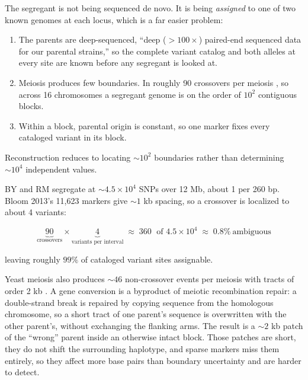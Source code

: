 The segregant is not being sequenced de novo. It is being \emph{assigned} to one of two
known genomes at each locus, which is a far easier problem:

\begin{enumerate}[leftmargin=1.4em,itemsep=1pt,topsep=2pt]
  \item The parents are deep-sequenced, ``deep ($>100\times$) paired-end sequenced data for
    our parental strains,'' so the complete variant catalog and both alleles at every site
    are known before any segregant is looked at.
  \item Meiosis produces few boundaries. In  roughly 90 crossovers per
    meiosis \citep{manceraHighResolutionMapping2008}, so across 16 chromosomes a segregant
    genome is on the order of $10^2$ contiguous blocks.
  \item Within a block, parental origin is constant, so one marker fixes every cataloged
    variant in its block.
\end{enumerate}

Reconstruction reduces to locating $\sim\!10^2$ boundaries rather than determining
$\sim\!10^4$ independent values.

 BY and RM
segregate at $\sim\!4.5\times10^4$ SNPs over 12 Mb, about 1 per 260 bp. Bloom 2013's 11,623
markers give $\sim\!1$ kb spacing, so a crossover is localized to about 4 variants:

$$
\underbrace{90}_{\text{crossovers}} \times \underbrace{4}_{\text{variants per interval}}
\;\approx\; 360 \;\text{ of } 4.5\times10^4 \;\approx\; 0.8\%\ \text{ambiguous}
$$

leaving roughly $99\%$ of cataloged variant sites assignable. 

 Yeast meiosis also produces $\sim\!46$
non-crossover  events per meiosis with tracts of order 2 kb
\citep{manceraHighResolutionMapping2008}. A gene conversion is a byproduct of meiotic
recombination repair: a double-strand break is repaired by copying sequence from the
homologous chromosome, so a short tract of one parent's sequence is overwritten with the
other parent's, without exchanging the flanking arms. The result is a $\sim\!2$ kb patch
of the ``wrong'' parent inside an otherwise intact block. Those patches are short, they do
not shift the surrounding haplotype, and sparse markers miss them entirely, so they affect
more base pairs than boundary uncertainty and are harder to detect.

